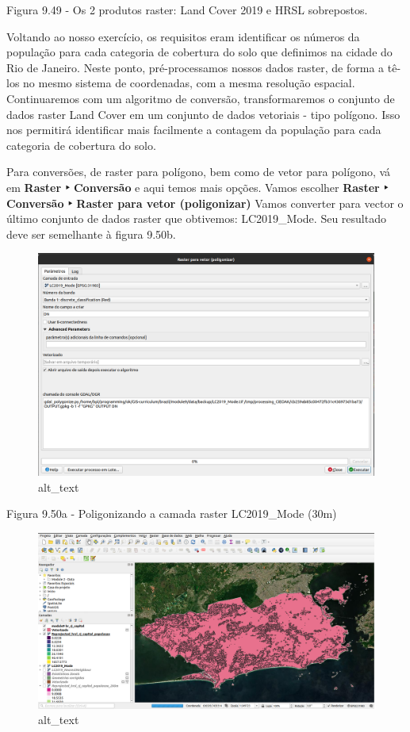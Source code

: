 \documentclass[
]{book}
\begin{document}
Figura 9.49 - Os 2 produtos raster: Land Cover 2019 e HRSL sobrepostos.

Voltando ao nosso exercício, os requisitos eram identificar os números da população para cada categoria de cobertura do solo que definimos na cidade do Rio de Janeiro. Neste ponto, pré-processamos nossos dados raster, de forma a tê-los no mesmo sistema de coordenadas, com a mesma resolução espacial. Continuaremos com um algoritmo de conversão, transformaremos o conjunto de dados raster Land Cover em um conjunto de dados vetoriais - tipo polígono. Isso nos permitirá identificar mais facilmente a contagem da população para cada categoria de cobertura do solo.

Para conversões, de raster para polígono, bem como de vetor para polígono, vá em \textbf{Raster ‣ Conversão} e aqui temos mais opções. Vamos escolher \textbf{Raster ‣ Conversão ‣ Raster para vetor (poligonizar)} Vamos converter para vector o último conjunto de dados raster que obtivemos: LC2019\_Mode. Seu resultado deve ser semelhante à figura 9.50b.

\begin{figure}
\centering
\includegraphics{media/modulo9/fig950_a.png}
\caption{alt\_text}
\end{figure}

Figura 9.50a - Poligonizando a camada raster LC2019\_Mode (30m)

\begin{figure}
\centering
\includegraphics{media/modulo9/fig950_b.png}
\caption{alt\_text}
\end{figure}
\end{document}
